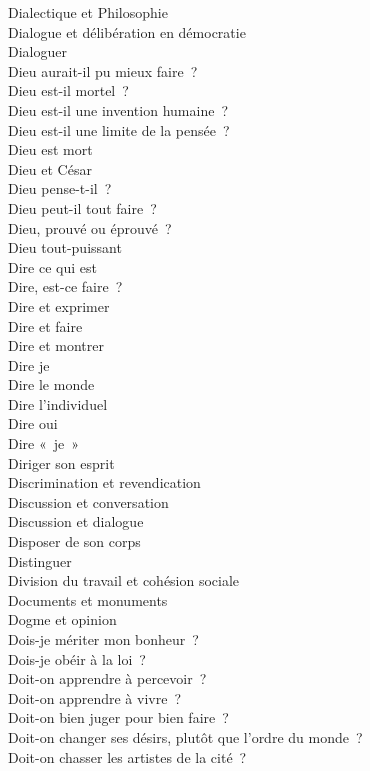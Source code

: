 \documentclass[a4paper,12pt]{article}
\begin{document}
Dialectique et Philosophie \\
Dialogue et délibération en démocratie \\
Dialoguer \\
Dieu aurait-il pu mieux faire ? \\
Dieu est-il mortel ? \\
Dieu est-il une invention humaine ? \\
Dieu est-il une limite de la pensée ? \\
Dieu est mort \\
Dieu et César \\
Dieu pense-t-il ? \\
Dieu peut-il tout faire ? \\
Dieu, prouvé ou éprouvé ? \\
Dieu tout-puissant \\
Dire ce qui est \\
Dire, est-ce faire ? \\
Dire et exprimer \\
Dire et faire \\
Dire et montrer \\
Dire je \\
Dire le monde \\
Dire l'individuel \\
Dire oui \\
Dire « je » \\
Diriger son esprit \\
Discrimination et revendication \\
Discussion et conversation \\
Discussion et dialogue \\
Disposer de son corps \\
Distinguer \\
Division du travail et cohésion sociale \\
Documents et monuments \\
Dogme et opinion \\
Dois-je mériter mon bonheur ? \\
Dois-je obéir à la loi ? \\
Doit-on apprendre à percevoir ? \\
Doit-on apprendre à vivre ? \\
Doit-on bien juger pour bien faire ? \\
Doit-on changer ses désirs, plutôt que l'ordre du monde ? \\
Doit-on chasser les artistes de la cité ? \\
\end{document}
